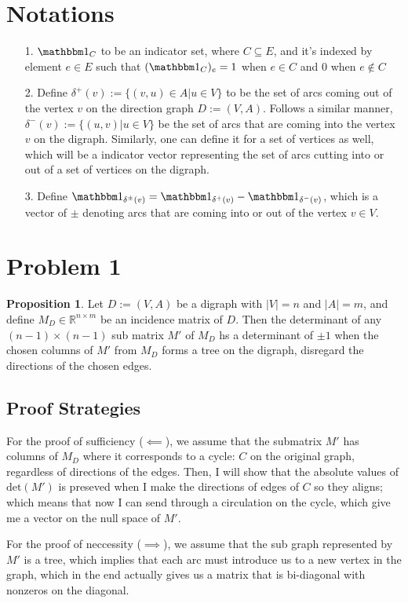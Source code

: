 \documentclass[]{article}
\theoremstyle{definition}
\newtheorem{prop}{Proposition}[section]  %
\begin{document}
\section*{Notations}
    \begin{itemize}
        \item [1.] $\mathbbm 1_{C}$ to be an indicator set, where $C \subseteq E$, and it's indexed by element $e\in E$ such that $(\mathbbm 1_C)_e = 1$ when $e\in C$ and $0$ when $e\not\in C$
        \item [2.] Define $\delta^+(v):= \{(v, u)\in A| u\in V \}$ to be the set of arcs coming out of the vertex $v$ on the direction graph $D:=(V, A)$. Follows a similar manner, $\delta^-(v):= \{(u, v)| u\in V\}$ be the set of arcs that are coming into the vertex $v$ on the digraph. Similarly, one can define it for a set of vertices as well, which will be a indicator vector representing the set of arcs cutting into or out of a set of vertices on the digraph. 
        \item [3.] Define $\mathbbm 1_{\delta^{\pm}(v)} = \mathbbm 1_{\delta^+(v)}  - \mathbbm 1_{\delta^-(v)}$, which is a vector of $\pm$ denoting arcs that are coming into or out of the vertex $v\in V$. 
    \end{itemize}
\section{Problem 1}
    \begin{prop}
        Let $D:= (V, A)$ be a digraph with $|V| = n$ and $|A| = m$, and define $M_D\in \mathbb R^{n\times m}$ be an incidence matrix of $D$. Then the determinant of any $(n - 1)\times (n - 1)$ sub matrix $M'$ of $M_D$ hs a determinant of $\pm1$ when the chosen columns of $M'$ from $M_D$ forms a tree on the digraph, disregard the directions of the chosen edges. 
    \end{prop}
    \subsection{Proof Strategies}
        For the proof of sufficiency ($\impliedby$), we assume that the submatrix $M'$ has columns of $M_D$ where it corresponds to a cycle: $C$ on the original graph, regardless of directions of the edges. Then, I will show that the absolute values of $\text{det}(M')$ is preseved when I make the directions of edges of $C$ so they aligns; which means that now I can send through a circulation on the cycle, which give me a vector on the null space of $M'$. 
        \par
        For the proof of neccessity ($\implies$), we assume that the sub graph represented by $M'$ is a tree, which implies that each arc must introduce us to a new vertex in the graph, which in the end actually gives us a matrix that is bi-diagonal with nonzeros on the diagonal. 
\end{document}
